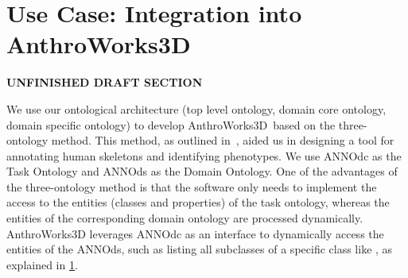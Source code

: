 \documentclass[sw]{iosart2x}
\newcommand{\aw}{AnthroWorks3D}
\begin{document}
\section{Use Case: Integration into \aw{}}\label{sec:aw}
\textbf{UNFINISHED DRAFT SECTION}

We use our ontological architecture (top level ontology, domain core ontology, domain specific ontology) to develop \aw{}~based on the three-ontology method.
This method, as outlined in~\citet{threeontologymethod}, aided us in designing a tool for annotating human skeletons and identifying phenotypes. 
We use ANNOdc as the Task Ontology and ANNOds as the Domain Ontology.
One of the advantages of the three-ontology method is that the software only needs to implement the access to the entities (classes and properties) of the task ontology, whereas the entities of the corresponding domain ontology are processed dynamically.
\aw{} leverages ANNOdc as an interface to dynamically access the entities of the ANNOds, such as listing all subclasses of a specific class like , as explained in \cref{sec:aw}.
\end{document}
